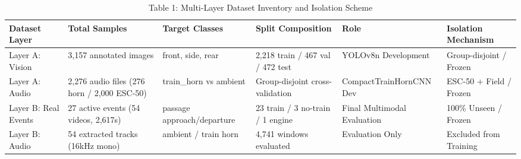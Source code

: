 \begin{table}[t]
\centering
\caption{Table 1: Multi-Layer Dataset Inventory and Isolation Scheme}
\label{tab:table01_dataset_composition}
\begin{tabular}{llllll}
\hline
Dataset Layer & Total Samples & Target Classes & Split Composition & Role & Isolation Mechanism \\
\hline
Layer A: Vision & 3,157 annotated images & front, side, rear & 2,218 train / 467 val / 472 test & YOLOv8n Development & Group-disjoint / Frozen \\
Layer A: Audio & 2,276 audio files (276 horn / 2,000 ESC-50) & train\_horn vs ambient & Group-disjoint cross-validation & CompactTrainHornCNN Dev & ESC-50 + Field / Frozen \\
Layer B: Real Events & 27 active events (54 videos, 2,617s) & passage approach/departure & 23 train / 3 no-train / 1 engine & Final Multimodal Evaluation & 100\% Unseen / Frozen \\
Layer B: Audio & 54 extracted tracks (16kHz mono) & ambient / train horn & 4,741 windows evaluated & Evaluation Only & Excluded from Training \\
\hline
\end{tabular}
\end{table}
